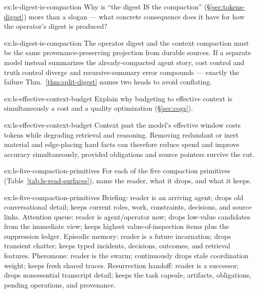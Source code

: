 \documentclass[11pt,a4paper]{article}
\theoremstyle{definition}
\theoremstyle{plain}
\begin{document}

\begin{pdexercise}[kind=Check,rating=1]{ex:ls-digest-is-compaction}
Why is ``the digest IS the compaction'' (\S\ref{sec:tokens-digest}) more than a
slogan --- what concrete consequence does it have for how the operator's digest is
produced?
\end{pdexercise}
\begin{pdsolution}{ex:ls-digest-is-compaction}
The operator digest and the context compaction must be the same provenance-preserving projection from durable sources. If a separate model instead summarizes the already-compacted agent story, cost control and truth control diverge and recursive-summary error compounds --- exactly the failure Thm.~\ref{thm:split-digest} names two heads to avoid conflating.
\end{pdsolution}
\begin{pdexercise}[kind=Check,rating=1]{ex:ls-effective-context-budget}
Explain why budgeting to effective context is simultaneously a cost
and a quality optimization (\S\ref{sec:cogs}).
\end{pdexercise}
\begin{pdsolution}{ex:ls-effective-context-budget}
Context past the model's effective window costs tokens while degrading retrieval and reasoning. Removing redundant or inert material and edge-placing hard facts can therefore reduce spend and improve accuracy simultaneously, provided obligations and source pointers survive the cut.
\end{pdsolution}
\begin{pdexercise}[kind=Trace,rating=2]{ex:ls-five-compaction-primitives}
For each of the five compaction primitives (Table~\ref{tab:ls-read-surfaces}),
name the reader, what it drops, and what it keeps.
\end{pdexercise}
\begin{pdsolution}{ex:ls-five-compaction-primitives}
Briefing: reader is an arriving agent; drops old conversational detail; keeps current roles, work, constraints, decisions, and source links. Attention queue: reader is agent/operator now; drops low-value candidates from the immediate view; keeps highest value-of-inspection items plus the suppression ledger. Episodic memory: reader is a future incarnation; drops transient chatter; keeps typed incidents, decisions, outcomes, and retrieval features. Pheromone: reader is the swarm; continuously drops stale coordination weight; keeps fresh shared traces. Resurrection handoff: reader is a successor; drops nonessential transcript detail; keeps the task capsule, artifacts, obligations, pending operations, and provenance.
\end{pdsolution}
\end{document}
